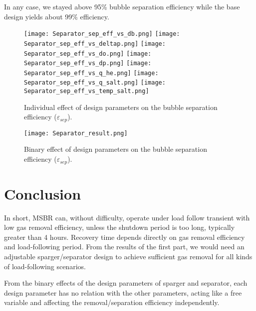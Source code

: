 \begin{itemize}
    In any case, we stayed above 95\% bubble separation efficiency while the 
    base design yields about 99\% efficiency.

\begin{figure}[htbp!]
    \begin{center}
        \texttt{[image: Separator\_sep\_eff\_vs\_db.png]}
        \texttt{[image: Separator\_sep\_eff\_vs\_deltap.png]}
        \texttt{[image: Separator\_sep\_eff\_vs\_do.png]}
        \texttt{[image: Separator\_sep\_eff\_vs\_dp.png]}
        \texttt{[image: Separator\_sep\_eff\_vs\_q\_he.png]}
        \texttt{[image: Separator\_sep\_eff\_vs\_q\_salt.png]}
        \texttt{[image: Separator\_sep\_eff\_vs\_temp\_salt.png]}
    \end{center}
    \caption{Individual effect of design parameters on the bubble separation 
        efficiency ($\varepsilon$$_{sep}$).}
    \label{fig:individual_eff_separator}
\end{figure}

\begin{figure}[htbp!]
    \begin{center}
        \texttt{[image: Separator\_result.png]}
    \end{center}
    \caption{Binary effect of design parameters on the bubble separation
    efficiency ($\varepsilon$$_{sep}$).}
    \label{fig:binary_eff_separator}
\end{figure}

\FloatBarrier

\section{Conclusion}

    In short, \gls{MSBR} can, without difficulty, operate under load follow transient 
    with low gas removal efficiency, unless the shutdown period is too long, 
    typically greater than 4 hours. Recovery time depends directly on gas 
    removal efficiency and load-following period. From the results of the first 
    part, we would need an adjustable sparger/separator design to achieve 
    sufficient gas removal for all kinds of load-following scenarios.

    From the binary effects of the design parameters of sparger and separator, 
    each design parameter has no relation with the other parameters, acting 
    like a free variable and affecting the removal/separation efficiency 
    independently.


\end{itemize}
